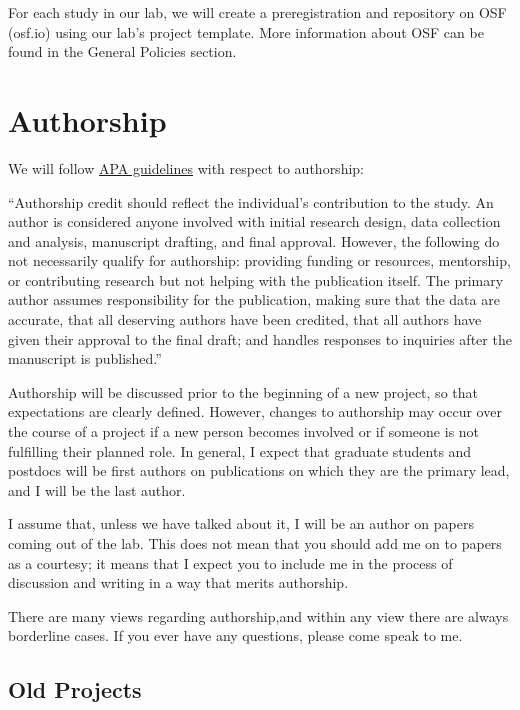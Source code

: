 \documentclass[]{book}
\begin{document}
For each study in our lab, we will create a preregistration and repository on OSF (osf.io) using our lab's project template. More information about OSF can be found in the General Policies section.

\hypertarget{authorship}{%
\section{Authorship}\label{authorship}}

We will follow \href{https://www.apa.org/research/responsible/publication/}{APA guidelines} with respect to authorship:

``Authorship credit should reflect the individual's contribution to the study. An author is considered anyone involved with initial research design, data collection and analysis, manuscript drafting, and final approval. However, the following do not necessarily qualify for authorship: providing funding or resources, mentorship, or contributing research but not helping with the publication itself. The primary author assumes responsibility for the publication, making sure that the data are accurate, that all deserving authors have been credited, that all authors have given their approval to the final draft; and handles responses to inquiries after the manuscript is published.''

Authorship will be discussed prior to the beginning of a new project, so that expectations are clearly defined. However, changes to authorship may occur over the course of a project if a new person becomes involved or if someone is not fulfilling their planned role. In general, I expect that graduate students and postdocs will be first authors on publications on which they are the primary lead, and I will be the last author.

I assume that, unless we have talked about it, I will be an author on papers coming out of the lab. This does not mean that you should add me on to
papers as a courtesy; it means that I expect you to include me in the process
of discussion and writing in a way that merits authorship.

There are many views regarding authorship,and within any view there are always borderline cases. If you ever have any questions, please come speak to me.

\hypertarget{old-projects}{%
\subsection{Old Projects}\label{old-projects}}
\end{document}
